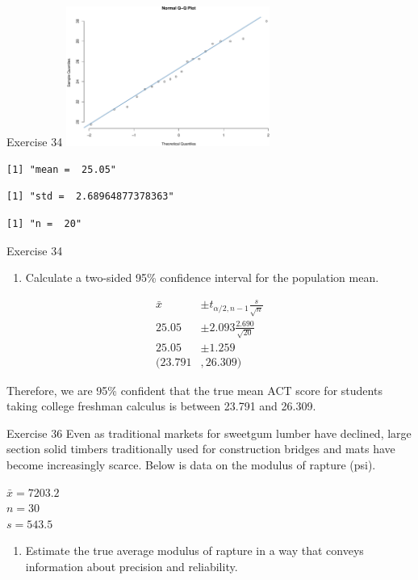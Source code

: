 \documentclass[
  ignorenonframetext,
]{beamer}
\providecommand{\tightlist}{%
  \setlength{\itemsep}{0pt}\setlength{\parskip}{0pt}}\usepackage{longtable,booktabs,array}
\begin{document}
\begin{frame}[fragile]{Exercise 34}
\protect\hypertarget{exercise-34-1}{}
\includegraphics[width=0.5\textwidth,height=\textheight]{Chapter8Slides_files/figure-beamer/unnamed-chunk-1-1.pdf}

\begin{verbatim}
[1] "mean =  25.05"
\end{verbatim}

\begin{verbatim}
[1] "std =  2.68964877378363"
\end{verbatim}

\begin{verbatim}
[1] "n =  20"
\end{verbatim}
\end{frame}

\begin{frame}{Exercise 34}
\protect\hypertarget{exercise-34-2}{}
\begin{enumerate}[<+->]
[a.]
\setcounter{enumi}{1}
\tightlist
\item
  Calculate a two-sided 95\% confidence interval for the population
  mean.
\end{enumerate}

\[
\begin{aligned}
\bar{x} &\pm t_{\alpha/2,n-1}\frac{s}{\sqrt{n}} \\
25.05 &\pm 2.093 \frac{2.690}{\sqrt{20}} \\
25.05 &\pm 1.259 \\
(23.791&, 26.309)
\end{aligned}
\]

Therefore, we are 95\% confident that the true mean ACT score for
students taking college freshman calculus is between 23.791 and 26.309.
\end{frame}

\begin{frame}{Exercise 36}
\protect\hypertarget{exercise-36}{}
Even as traditional markets for sweetgum lumber have declined, large
section solid timbers traditionally used for construction bridges and
mats have become increasingly scarce. Below is data on the modulus of
rapture (psi).

\(\bar{x} = 7203.2\)\\
\(n = 30\)\\
\(s = 543.5\)

\begin{enumerate}[<+->]
[a.]
\setcounter{enumi}{1}
\tightlist
\item
  Estimate the true average modulus of rapture in a way that conveys
  information about precision and reliability.
\end{enumerate}
\end{frame}
\end{document}
